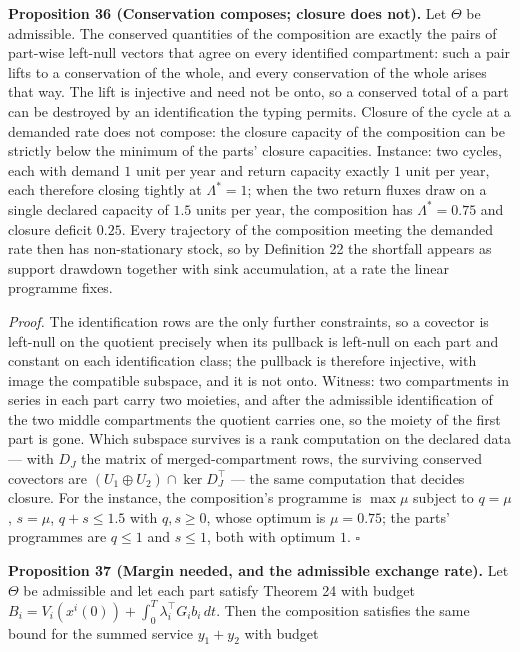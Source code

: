 \documentclass[11pt]{article}
\begin{document}
\textbf{Proposition 36 (Conservation composes; closure does not).} Let \(\Theta\) be admissible. The conserved quantities of the composition are exactly the pairs of part-wise left-null vectors that agree on every identified compartment: such a pair lifts to a conservation of the whole, and every conservation of the whole arises that way. The lift is injective and need not be onto, so a conserved total of a part can be destroyed by an identification the typing permits. Closure of the cycle at a demanded rate does not compose: the closure capacity of the composition can be strictly below the minimum of the parts' closure capacities. Instance: two cycles, each with demand \(1\) unit per year and return capacity exactly \(1\) unit per year, each therefore closing tightly at \(\Lambda^{*} = 1\); when the two return fluxes draw on a single declared capacity of \(1.5\) units per year, the composition has \(\Lambda^{*} = 0.75\) and closure deficit \(0.25\). Every trajectory of the composition meeting the demanded rate then has non-stationary stock, so by Definition 22 the shortfall appears as support drawdown together with sink accumulation, at a rate the linear programme fixes.

\emph{Proof.} The identification rows are the only further constraints, so a covector is left-null on the quotient precisely when its pullback is left-null on each part and constant on each identification class; the pullback is therefore injective, with image the compatible subspace, and it is not onto. Witness: two compartments in series in each part carry two moieties, and after the admissible identification of the two middle compartments the quotient carries one, so the moiety of the first part is gone. Which subspace survives is a rank computation on the declared data --- with \(D_J\) the matrix of merged-compartment rows, the surviving conserved covectors are \((U_1 \oplus U_2) \cap \ker D_J^{\top}\) --- the same computation that decides closure. For the instance, the composition's programme is \(\max \mu\) subject to \(q = \mu\), \(s = \mu\), \(q + s \le 1.5\) with \(q, s \ge 0\), whose optimum is \(\mu = 0.75\); the parts' programmes are \(q \le 1\) and \(s \le 1\), both with optimum \(1\). \(\square\)

\textbf{Proposition 37 (Margin needed, and the admissible exchange rate).} Let \(\Theta\) be admissible and let each part satisfy Theorem 24 with budget \(B_i =\allowbreak{} V_i(x^i(0)) +\allowbreak{} \int_0^T \lambda_i^{\top} G_i b_i\,\allowbreak{}dt\). Then the composition satisfies the same bound for the summed service \(y_1 + y_2\) with budget 
\end{document}
